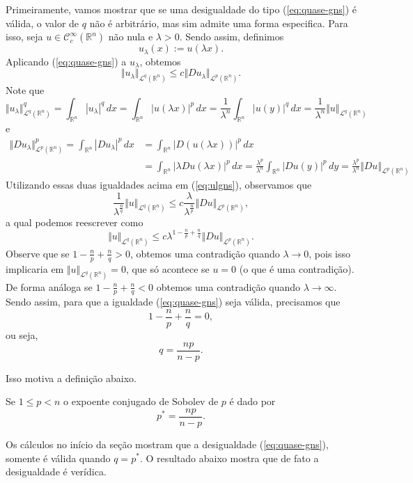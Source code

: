 \documentclass[a4paper, 11pt]{book}
\theoremstyle{definition}
\newcommand{\bR}{\mathbb{R}}
\newcommand{\cC}{\mathcal{C}}
\newcommand{\cL}{\mathcal{L}}
\begin{document}
Primeiramente, vamos mostrar que se uma desigualdade do tipo (\ref{eq:quase-gns}) é válida, o valor de $q$ não é arbitrário, mas sim admite uma forma especifica.
Para isso, seja $u \in \cC^\infty_c(\bR^n)$ não nula e $\lambda > 0$.
Sendo assim, definimos
\[
    u_\lambda(x) := u(\lambda x).
\]
Aplicando (\ref{eq:quase-gns}) a $u_\lambda$, obtemos
\begin{equation} \label{eq:ulgns}
    \Vert u_\lambda \Vert_{\cL^q(\bR^n)} \leqslant c \Vert Du_\lambda \Vert_{\cL^p(\bR^n)}.
\end{equation}
Note que
\[
    \Vert u_\lambda \Vert_{\cL^q(\bR^n)}^q = \int_{\bR^n} |u_\lambda|^q \,dx = \int_{\bR^n} |u(\lambda x)|^p \,dx = \frac{1}{\lambda^n} \int_{\bR^n} |u(y)|^q \,dx = \frac{1}{\lambda^n}\Vert u \Vert_{\cL^q(\bR^n)}
\]
e
\[
    \begin{aligned}
        \Vert Du_\lambda \Vert_{\cL^p(\bR^n)}^p = \int_{\bR^n} |Du_\lambda|^p \,dx &= \int_{\bR^n} |D(u(\lambda x))|^p \,dx \\
        &= \int_{\bR^n} |\lambda Du(\lambda x)|^p \,dx = \frac{\lambda^p}{\lambda^n} \int_{\bR^n} |Du(y)|^p \,dy = \frac{\lambda^p}{\lambda^n}\Vert Du \Vert_{\cL^p(\bR^n)}
    \end{aligned}
\]
Utilizando essas duas igualdades acima em (\ref{eq:ulgns}), observamos que
\[
    \frac{1}{\lambda^{\frac{n}{q}}} \Vert u \Vert_{\cL^q(\bR^n)} \leqslant c \frac{\lambda}{\lambda^{\frac{n}{p}}}\Vert Du \Vert_{\cL^p(\bR^n)},
\]
a qual podemos reescrever como
\begin{equation}
    \Vert u \Vert_{\cL^q(\bR^n)} \leqslant c\lambda^{1 - \frac{n}{p}  + \frac{n}{q}}\Vert Du \Vert_{\cL^p(\bR^n)}.
\end{equation}
Observe que se $1 - \frac{n}{p} + \frac{n}{q} > 0$, obtemos uma contradição quando $\lambda \to 0$, pois isso implicaria em $\Vert u \Vert_{\cL^q(\bR^n)} = 0$,
que só acontece se $u = 0$ (o que é uma contradição).
De forma análoga se $1 - \frac{n}{p} + \frac{n}{q} < 0$ obtemos uma contradição quando $\lambda \to \infty$.
Sendo assim, para que a igualdade (\ref{eq:quase-gns}) seja válida, precisamos que
\[
    1 - \frac{n}{p} + \frac{n}{q} = 0,
\]
ou seja,
\[
    q = \frac{np}{n - p}.
\]

Isso motiva a definição abaixo.
\begin{dbox}
    Se $1 \leqslant p < n$ o expoente conjugado de Sobolev de $p$ é dado por
    \[
        p^* = \frac{np}{n - p}.
    \]
\end{dbox}

Os cálculos no início da seção mostram que a desigualdade (\ref{eq:quase-gns}), somente é válida quando $q = p^*$. O resultado abaixo mostra que de fato a desigualdade é verídica.
\end{document}
